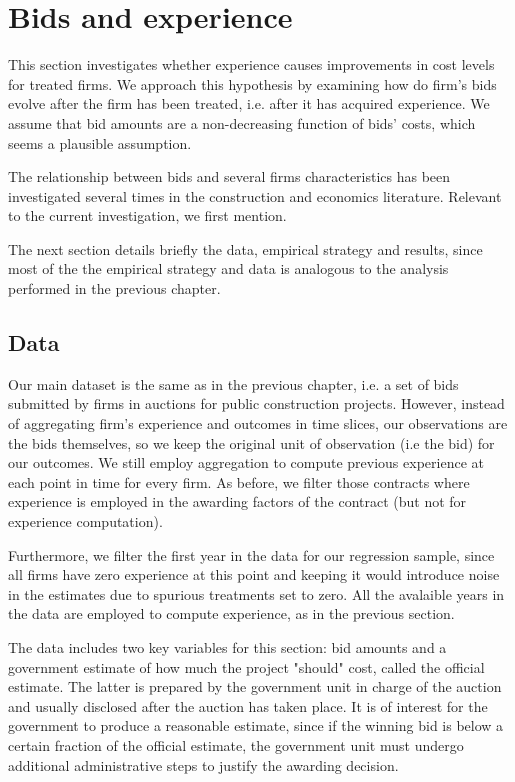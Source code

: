 \section{Bids and experience}
\label{section:bidsexp}
This section investigates whether experience causes improvements in cost levels for treated firms. We approach this hypothesis by examining how do firm's bids evolve after the firm has been treated, i.e. after it has acquired experience. We assume that bid amounts are a non-decreasing function of bids' costs, which seems a plausible assumption.

The relationship between bids and several firms characteristics has been investigated several times in the construction and economics literature. Relevant to the current investigation, we first mention.

The next section details briefly the data, empirical strategy and results, since most of the the empirical strategy and data is analogous to the analysis performed in the previous chapter.

\subsection{Data}
Our main dataset is the same as in the previous chapter, i.e. a set of bids submitted by firms in auctions for public construction projects. However, instead of aggregating firm's experience and outcomes in time slices, our observations are the bids themselves, so we keep the original unit of observation (i.e the bid) for our outcomes. We still employ aggregation to compute previous experience at each point in time for every firm. As before, we filter those contracts where experience is employed in the awarding factors of the contract (but not for experience computation).

Furthermore, we filter the first year in the data for our regression sample, since all firms have zero experience at this point and keeping it would introduce noise in the estimates due to spurious treatments set to zero. All the avalaible years in the data are employed to compute experience, as in the previous section.

The data includes two key variables for this section: bid amounts and a government estimate of how much the project "should" cost, called the official estimate. The latter is prepared by the government unit in charge of the auction and usually disclosed after the auction has taken place. It is of interest for the government to produce a reasonable estimate, since if the winning bid is below a certain fraction of the official estimate, the government unit must undergo additional administrative steps to justify the awarding decision.

